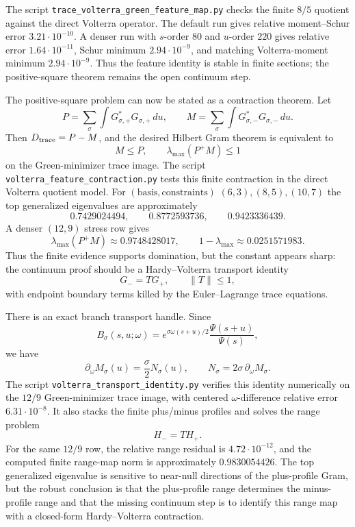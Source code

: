 \documentclass[11pt]{article}
\begin{document}
The script \texttt{trace\_volterra\_green\_feature\_map.py} checks the finite
\(8/5\) quotient against the direct Volterra operator.  The default run gives
relative moment--Schur error \(3.21\cdot10^{-10}\).  A denser run with
\(s\)-order \(80\) and \(u\)-order \(220\) gives relative error
\(1.64\cdot10^{-11}\), Schur minimum \(2.94\cdot10^{-9}\), and matching
Volterra-moment minimum \(2.94\cdot10^{-9}\).  Thus the feature identity is
stable in finite sections; the positive-square theorem remains the open
continuum step.

The positive-square problem can now be stated as a contraction theorem.  Let
\[
  P=\sum_\sigma\int G_{\sigma,+}^\ast G_{\sigma,+}\,du,\qquad
  M=\sum_\sigma\int G_{\sigma,-}^\ast G_{\sigma,-}\,du .
\]
Then \(D_{\rm trace}=P-M\), and the desired Hilbert Gram theorem is equivalent
to
\[
  M\le P,\qquad \lambda_{\max}(P^+M)\le 1
\]
on the Green-minimizer trace image.  The script
\texttt{volterra\_feature\_contraction.py} tests this finite contraction in the
direct Volterra quotient model.  For \((\text{basis},\text{constraints})\)
\((6,3),(8,5),(10,7)\) the top generalized eigenvalues are approximately
\[
  0.7429024494,\qquad 0.8772593736,\qquad 0.9423336439.
\]
A denser \((12,9)\) stress row gives
\[
  \lambda_{\max}(P^+M)\approx 0.9748428017,
  \qquad 1-\lambda_{\max}\approx 0.0251571983 .
\]
Thus the finite evidence supports domination, but the constant appears sharp:
the continuum proof should be a Hardy--Volterra transport identity
\[
  G_- = T G_+,\qquad \|T\|\le 1,
\]
with endpoint boundary terms killed by the Euler--Lagrange trace equations.

There is an exact branch transport handle.  Since
\[
  B_\sigma(s,u;\omega)
  =
  e^{\sigma\omega(s+u)/2}\frac{\Psi(s+u)}{\Psi(s)},
\]
we have
\[
  \partial_\omega M_\sigma(u)
  =
  \frac{\sigma}{2}N_\sigma(u),
  \qquad
  N_\sigma=2\sigma\,\partial_\omega M_\sigma .
\]
The script \texttt{volterra\_transport\_identity.py} verifies this identity
numerically on the \(12/9\) Green-minimizer trace image, with centered
\(\omega\)-difference relative error \(6.31\cdot10^{-8}\).  It also stacks the
finite plus/minus profiles and solves the range problem
\[
  H_-=T H_+.
\]
For the same \(12/9\) row, the relative range residual is
\(4.72\cdot10^{-12}\), and the computed finite range-map norm is
approximately \(0.9830054426\).  The top generalized eigenvalue is sensitive to
near-null directions of the plus-profile Gram, but the robust conclusion is
that the plus-profile range determines the minus-profile range and that the
missing continuum step is to identify this range map with a closed-form
Hardy--Volterra contraction.
\end{document}
